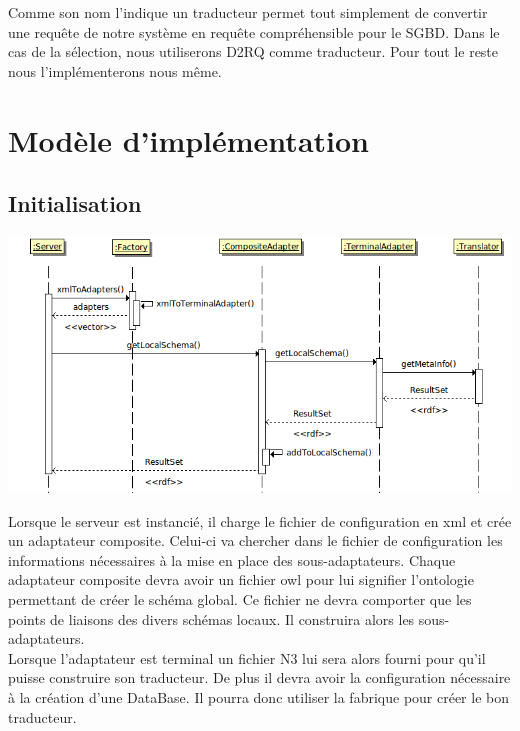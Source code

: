 \documentclass[12pt]{article}
\begin{document}
	Comme son nom l'indique un traducteur permet tout simplement de convertir une requête de notre système en requête compréhensible pour le SGBD. Dans le cas de la sélection, nous utiliserons D2RQ comme traducteur. Pour tout le reste nous l'implémenterons nous même.

\newpage

\section{Modèle d'implémentation}

\subsection{Initialisation}

\begin{center}
	\includegraphics[scale=0.60]{images/sequence_init.png}
\end{center}

	Lorsque le serveur est instancié, il charge le fichier de configuration en xml et crée un adaptateur composite. Celui-ci va chercher dans le fichier de configuration les informations nécessaires à la mise en place des sous-adaptateurs. Chaque adaptateur composite devra avoir un fichier owl pour lui signifier l'ontologie permettant de créer le schéma global. Ce fichier ne devra comporter que les points de liaisons des divers schémas locaux. Il construira alors les sous-adaptateurs. \\

\indent Lorsque l'adaptateur est terminal un fichier N3 lui sera alors fourni pour qu'il puisse construire son traducteur. De plus il devra avoir la configuration nécessaire à la création d'une DataBase. Il pourra donc utiliser la fabrique pour créer le bon traducteur.
\end{document}
